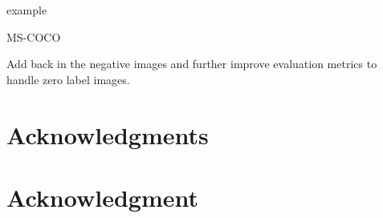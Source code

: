 \documentclass[12pt,journal,compsoc]{IEEEtran}
\begin{document}
example~\cite{Sechidis2011}

MS-COCO~\cite{MSCOCO}

Add back in the negative images and further improve evaluation metrics to handle zero label images.





%





\ifCLASSOPTIONcompsoc
  \section*{Acknowledgments}
\else
  \section*{Acknowledgment}
\fi
\end{document}
